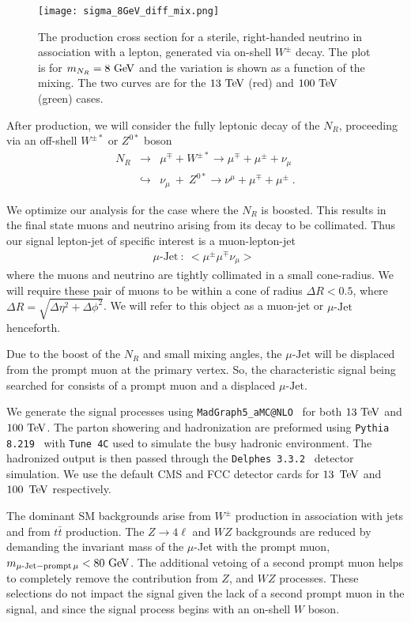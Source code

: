 \documentclass[reprint,doublecolumn,secnumarabic,amssymb, amsmath, aps,nofootinbib,superscriptaddress]{revtex4-1}
\newcommand{\bea}{\begin{eqnarray}}
\newcommand{\eea}{\end{eqnarray}}
\newcommand{\ba}{\begin{eqnarray*}}
\newcommand{\ea}{\end{eqnarray*}}
\def\nn{\nonumber}
\newcommand{\Cit}[1]{~\cite{#1}}
\def\TeV{\ifmmode {\mathrm{\ Te\kern -0.1em V}}\else
                   \textrm{Te\kern -0.1em V}\fi}%
\def\GeV{\ifmmode {\mathrm{\ Ge\kern -0.1em V}}\else
                   \textrm{Ge\kern -0.1em V}\fi}%
\newcommand{\ttbar}{\ensuremath{t\bar{t}}}
\begin{document}
\begin{figure}
  \centering
   \texttt{[image: sigma\_8GeV\_diff\_mix.png]}
  \caption{The production cross section for a sterile, right-handed neutrino in association with a lepton, generated via on-shell $W^\pm$ decay. The plot is for $m_{N_R}=8\GeV$ and the variation is
  shown as a function of the mixing. The two curves are for the $13\TeV$ (red) and $100\TeV$ (green) cases.}
  \label{lim8}
\end{figure}	

After production, we will consider the fully leptonic decay of the $N_R$, proceeding via an off-shell $W^{\pm *}$ or $Z^{0 *}$ boson 
\bea
N_R &\rightarrow& \mu^{\mp}+W^{\pm *} \rightarrow \mu^{\mp} + \mu^{\pm} + \nu_\mu \\ \nn
&\hookrightarrow& \nu_{\mu}~+~Z^{0 *} \rightarrow \nu^{\mu} + \mu^{\mp} + \mu^{\pm}\; .
\eea

We optimize our analysis for the case where the $N_R$ is boosted. This results in the final state muons and neutrino arising from its decay to be collimated. Thus our signal lepton-jet of specific interest is a muon-lepton-jet
\ba
\mu\text{-Jet} ~: ~ <\mu^{\pm}\mu^{\mp}\nu_\mu>\;
\ea
where the muons and neutrino are tightly collimated in a small cone-radius. We will require these pair of muons to be within a cone of radius $\Delta R<0.5$, where $\Delta R = \sqrt{\Delta\eta^2 + \Delta\phi^2}$. We will refer to this object as a muon-jet or $\mu\text{-Jet}$ henceforth.

Due to the boost of the $N_R$ and small mixing angles, the $\mu\text{-Jet}$ will be displaced from the prompt muon at the primary vertex. So, the characteristic signal being searched for consists of a prompt muon and a displaced $\mu\text{-Jet}$.

We generate the signal processes using \texttt{MadGraph5\_aMC@NLO}~\cite{Alwall:2014hca} for both $13\TeV$ and $100\TeV$. The parton showering and hadronization are preformed using \texttt{Pythia 8.219}\Cit{Sjostrand:2014zea} with \texttt{Tune 4C} used to simulate the busy hadronic environment. The hadronized output is then passed through the \texttt{Delphes 3.3.2}~\cite{deFavereau:2013fsa} detector simulation. We use the default CMS and FCC detector cards for $13\,\TeV$ and $100\,\TeV$ respectively. 

The dominant SM backgrounds arise from $W^\pm$ production in association with jets and from $\ttbar$ production. The $Z\rightarrow 4\ell$ and $WZ$ backgrounds are reduced
by demanding the invariant mass of the $\mu$-Jet with the prompt muon, $m_{\mu\text{-Jet}-\rm{prompt\,}\mu } < 80 \GeV$. The additional vetoing of a second prompt muon helps to completely
remove the contribution from $Z$, and $WZ$ processes. These selections do not impact the signal given the lack of a second prompt muon in the signal, and since the signal process begins with an
on-shell $W$ boson.
\end{document}
